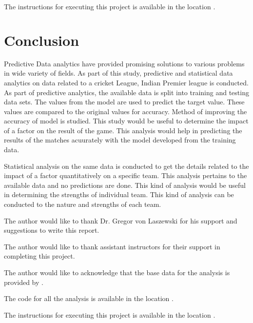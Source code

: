 \documentclass[sigconf]{acmart}
\begin{document}
The instructions for executing this project is available in the location \cite{requirements} . 
 
\section{Conclusion}

Predictive Data analytics have provided promising solutions to various problems in wide variety of fields. As part of this study, predictive and statistical data analytics on data related to a cricket League, Indian Premier league is conducted.  As part of predictive analytics, the available data is split into training and testing data sets. The values from the model are used to predict the target value. These values are compared to the original values for accuracy. Method of improving the accuracy of model is studied. This study would be useful to determine the impact of a factor on the result of the game. This analysis would help in predicting the results of the matches acuurately with the model developed from the training data.

Statistical analysis on the same data is conducted to get the details related to the impact of a factor quantitatively on a specific team. This analysis pertains to the available data and no predictions are done. This kind of analysis would be useful in determining the strengths of individual team. This kind of analysis can be conducted to the nature and strengths of each team.

\begin{acks}

  The author would like to thank Dr. Gregor von Laszewski for his
  support and suggestions to write this report.
  
  The author would like to thank assistant instructors for their support in completing this project.
  
  The author would like to acknowledge that the base data for the analysis is provided  by \cite{data} .
  

\end{acks}


 

\appendix



The code for all the analysis is available in the location \cite{code} .

The instructions for executing this project is available in the location \cite{requirements} .
\end{document}
